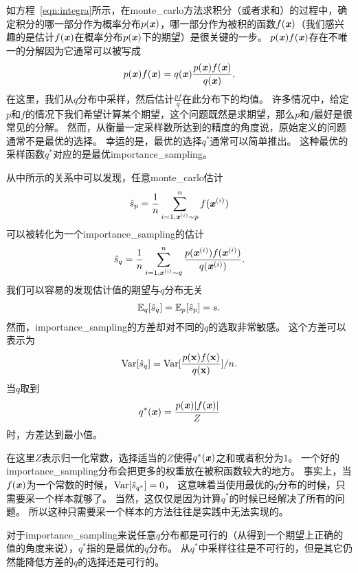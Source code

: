 如方程~\eqref{eqn:integra}所示，在\gls{monte_carlo}方法求积分（或者求和）的过程中，确定积分的哪一部分作为概率分布$p(\boldsymbol{\mathit{x}})$，哪一部分作为被积的函数$f(\boldsymbol{\mathit{x}})$（我们感兴趣的是估计$f(\boldsymbol{\mathit{x}})$在概率分布$p(\boldsymbol{\mathit{x}})$下的期望）是很关键的一步。
$p(\boldsymbol{\mathit{x}})f(\boldsymbol{\mathit{x}})$存在不唯一的分解因为它通常可以被写成
\begin{align}
\label{eqn:decomposition}
p(\boldsymbol{\mathit{x}})f(\boldsymbol{\mathit{x}}) = q(\boldsymbol{\mathit{x}}) \frac{p(\boldsymbol{\mathit{x}})f(\boldsymbol{\mathit{x}})}{q(\boldsymbol{\mathit{x}})},
\end{align}
在这里，我们从$q$分布中采样，然后估计$\frac{pf}{q}$在此分布下的均值。
许多情况中，给定$p$和$f$的情况下我们希望计算某个期望，这个问题既然是求期望，那么$p$和$f$最好是很常见的分解。
然而，从衡量一定采样数所达到的精度的角度说，原始定义的问题通常不是最优的选择。
幸运的是，最优的选择$q^*$通常可以简单推出。
这种最优的采样函数$q^*$对应的是最优\gls{importance_sampling}。


从中所示的关系中可以发现，任意\gls{monte_carlo}估计
\begin{align}
\hat{s}_p = \frac{1}{n}\sum_{i=1,\boldsymbol{\mathit{x}}^{(i)}\sim p}^{n}f(\boldsymbol{\mathit{x}}^{(i)})
\end{align}
可以被转化为一个\gls{importance_sampling}的估计
\begin{align}
\hat{s}_q = \frac{1}{n}\sum_{i=1,\boldsymbol{\mathit{x}}^{(i)}\sim q}^{n}\frac{p(\boldsymbol{\mathit{x}}^{(i)})f(\boldsymbol{\mathit{x}}^{(i)})}{q(\boldsymbol{\mathit{x}}^{(i)})}.
\end{align}
我们可以容易的发现估计值的期望与$q$分布无关
\begin{align}
\mathbb{E}_q [\hat{s}_q] = \mathbb{E}_p [\hat{s}_p] = s.
\end{align}
然而，\gls{importance_sampling}的方差却对不同的$q$的选取非常敏感。
这个方差可以表示为
\begin{align}
\label{eqn:variance_of_is}
\text{Var} [\hat{s}_q] = \text{Var} [\frac{p(\mathbf{x})f(\mathbf{x})}{q(\mathbf{x})}]/n.
\end{align}
当$q$取到
\begin{align}
q^*(\boldsymbol{\mathit{x}}) = \frac{p(\boldsymbol{\mathit{x}})\vert f(\boldsymbol{\mathit{x}})\vert}{Z}
\end{align}
时，方差达到最小值。


在这里$Z$表示归一化常数，选择适当的$Z$使得$q^*(\boldsymbol{\mathit{x}})$之和或者积分为$1$。
一个好的\gls{importance_sampling}分布会把更多的权重放在被积函数较大的地方。
事实上，当$f(\boldsymbol{\mathit{x}})$为一个常数的时候，$\text{Var}[\hat{s}_{q^*}]=0$， 这意味着当使用最优的$q$分布的时候，只需要采一个样本就够了。
当然，这仅仅是因为计算$q^*$的时候已经解决了所有的问题。
所以这种只需要采一个样本的方法往往是实践中无法实现的。

对于\gls{importance_sampling}来说任意$q$分布都是可行的（从得到一个期望上正确的值的角度来说），$q^*$指的是最优的$q$分布。
从$q^*$中采样往往是不可行的，但是其它仍然能降低方差的$q$的选择还是可行的。



